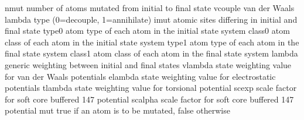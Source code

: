 \documentclass[letterpaper,11pt,english]{sphinxmanual}
\begin{document}
\begin{sphinxVerbatim}[commandchars=\\\{\}]
nmut            number of atoms mutated from initial to final state
vcouple         van der Waals lambda type (0=decouple, 1=annihilate)
imut            atomic sites differing in initial and final state
type0           atom type of each atom in the initial state system
class0          atom class of each atom in the initial state system
type1           atom type of each atom in the final state system
class1          atom class of each atom in the final state system
lambda          generic weighting between initial and final states
vlambda         state weighting value for van der Waals potentials
elambda         state weighting value for electrostatic potentials
tlambda         state weighting value for torsional potential
scexp           scale factor for soft core buffered 14\PYGZhy{}7 potential
scalpha         scale factor for soft core buffered 14\PYGZhy{}7 potential
mut             true if an atom is to be mutated, false otherwise
\end{sphinxVerbatim}

\sphinxAtStartPar
{}
\end{document}
